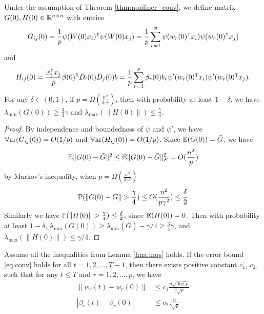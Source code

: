 \begin{lemma}
\label{lma:GH}
Under the assumption of Theorem \ref{thm:nonliner_conv}, we define matrix $G(0),H(0)\in\mathbb{R}^{n\times n}$ with entries
\begin{equation}
\label{eq:def_G0}
G_{ij}(0) = \frac{1}{p}\psi(W(0)x_i)\transpose \psi(W(0)x_j) = \frac{1}{p}\sum_{r=1}^p\psi(w_r(0)\transpose x_i)\psi(w_r(0)\transpose x_j) 
\end{equation}
and 
\begin{equation}
\label{eq:def_H0}
H_{ij}(0) = \frac{x_i\transpose x_j}{p}\beta(0)\transpose D_i(0)D_j(0)b = \frac{1}{p}\sum_{r=1}^p\beta_r(0)b_r\psi'(w_r(0)\transpose x_i)\psi'(w_r(0)\transpose x_j).
\end{equation}
For any $\delta \in (0,1)$, if $p=\Omega(\frac{n^2}{\delta\gamma^2})$, then with probability at least $1-\delta$, we have $\lambda_{\min}(G(0))\geq \frac{3}{4}\gamma$ and $\lambda_{\max}(\|H(0)\|)\leq \frac{\gamma}{4}$.
\end{lemma}
\begin{proof}
By independence and boundedness of $\psi$ and $\psi'$, we have $\mathbb{V}\mathrm{ar}(G_{ij}(0)) = O(1/p)$ and $\mathbb{V}\mathrm{ar}(H_{ij}(0)) = O(1/p)$. Since $\mathbb{E}(G(0))=\bar{G}$, we have
\begin{equation*}
\mathbb{E}\|G(0)-\bar{G}\|^2 \leq \mathbb{E}\|G(0)-\bar{G}\|^2_F = O(\frac{n^2}{p})
\end{equation*}
by Markov's inequality, when $p=\Omega(\frac{n^2}{\delta\gamma^2})$
\begin{equation*}
    \prob(\|G(0)-\bar{G}\|>\frac{\gamma}{4})\leq O(\frac{n^2}{p\gamma^2})\leq\frac{\delta}{2}
\end{equation*}
Similarly we have $\prob(\|H(0)\|>\frac{\gamma}{4})\leq\frac{\delta}{2}$, since $\mathbb{E}(H(0))=0$. Then with probability at least $1-\delta$, $\lambda_{\min}(G(0)) \geq \lambda_{\min}(\bar{G}) -\gamma/4 \geq \frac{3}{4}\gamma$, and $\lambda_{\max}(\|H(0)\|)\leq \gamma/4$.
\end{proof}



\begin{lemma}
\label{lma:weights}
Assume all the inequalities from Lemma \ref{lma:inqs} holds. If the error bound \eqref{eq:conv} holds for all $t=1,2,...,T-1$, then there exists positive constant $c_1$, $c_2$, such that for any $t\leq T$ and $r=1,2,...,p$, we have 
\begin{equation}
\label{eq:weights}
\begin{aligned}
    \|w_r(t)-w_r(0)\| &\leq c_1\frac{n\sqrt{\log p}}{\gamma\sqrt p} \\
    |\beta_r(t)-\beta_r(0)| &\leq c_2\frac{n}{\gamma\sqrt p}
\end{aligned}
\end{equation}
\end{lemma}


